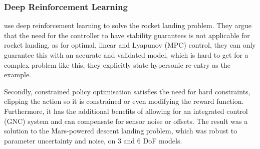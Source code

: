 \subsubsection{Deep Reinforcement Learning}
\label{sec:DRL}

\cite{Gaudet2018} use deep reinforcement learning to solve the rocket landing problem. They argue that the need for the controller to have stability guarantees is not applicable for rocket landing, as for optimal, linear and Lyapunov (MPC) control, they can only guarantee this with an accurate and validated model, which is hard to get for a complex problem like this, they explicitly state hypersonic re-entry as the example.

Secondly, constrained policy optimisation satisfies the need for hard constraints, clipping the action so it is constrained or even modifying the reward function. Furthermore, it has the additional benefits of allowing for an integrated control (GNC) system and can compensate for sensor noise or offsets. The result was a solution to the Mars-powered descent landing problem, which was robust to parameter uncertainty and noise, on 3 and 6 DoF models.
